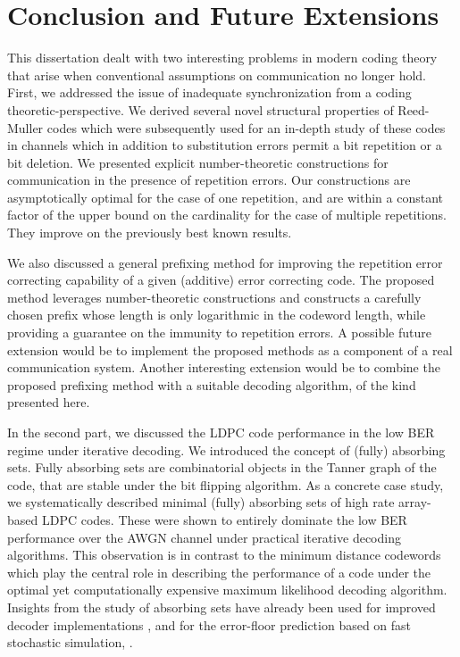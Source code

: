 \part[Conclusion and Future Extensions]{Conclusion and Future
Extensions}\label{last}

This dissertation dealt with two interesting problems in modern
coding theory that arise when conventional assumptions on
communication no longer hold. First, we addressed the issue of
inadequate synchronization from a coding theoretic-perspective. We
derived several novel structural properties of Reed-Muller codes
which were subsequently used for an in-depth study of these codes in
channels which in addition to substitution errors permit a bit
repetition or a bit deletion. We presented explicit number-theoretic
constructions for communication in the presence of repetition
errors. Our constructions are asymptotically optimal for the case of
one repetition, and are within a constant factor of the upper bound
on the cardinality for the case of multiple repetitions. They
improve on the previously best known results.

We also discussed  a general prefixing method for improving the
repetition error correcting capability of a given (additive) error
correcting code.  The proposed method leverages number-theoretic
constructions and constructs a carefully chosen prefix whose length
is only logarithmic in the codeword length, while providing a
guarantee on the immunity to repetition errors. A possible future
extension would be to implement the proposed methods as a component
of  a real communication system. Another interesting extension would
be to combine the proposed prefixing method with a suitable decoding
algorithm, of the kind presented here.

In the second part, we discussed the LDPC code performance in the
low BER regime under iterative decoding. We introduced the concept
of (fully) absorbing sets. Fully absorbing sets are combinatorial
objects in the Tanner graph of the code, that are stable under the
bit flipping algorithm. As a concrete case study, we systematically
described minimal (fully) absorbing sets of high rate array-based
LDPC codes. These were shown to entirely dominate the low BER
performance over the AWGN channel under practical iterative decoding
algorithms. This observation is in contrast to the minimum distance
codewords which play the central role in describing the performance
of a code under the optimal yet computationally expensive maximum
likelihood decoding algorithm. Insights from the study of absorbing
sets have already been used for improved decoder implementations
\cite{ICCquant}, and for the error-floor prediction based on fast
stochastic simulation, \cite{itw:07}.

